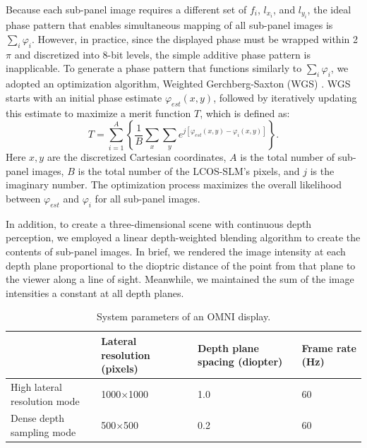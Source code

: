 \documentclass[9pt,twocolumn,twoside]{osajnl}
\begin{document}
Because each sub-panel image requires a different set of $f_i$, $l_{x_i}$, and $l_{y_i}$, the ideal phase pattern that enables simultaneous mapping of all sub-panel images is $\sum_{i}\varphi_{i}$. However, in practice, since the displayed phase must be wrapped within 2$\pi$ and discretized into 8-bit levels, the simple additive phase pattern is inapplicable. To generate a phase pattern that functions similarly to $\sum_{i}\varphi_{i}$, we adopted an optimization algorithm, Weighted Gerchberg-Saxton (WGS) \cite{di2007computer,bianchi2010real}. WGS starts with an initial phase estimate $\varphi_{est}(x,y)$, followed by iteratively updating this estimate to maximize a merit function $T$, which is defined as:
\begin{equation}
T=\sum_{i=1}^{A}\left\{\frac{1}{B}\sum_{x}\sum_{y}e^{j\left[\varphi _{est}(x,y)-\varphi _{i}(x,y)\right]}\right\}.
\label{eq:2}
\end{equation}
Here $x, y$ are the discretized Cartesian coordinates, $A$ is the total number of sub-panel images, $B$ is the total number of the LCOS-SLM’s pixels, and $j$ is the imaginary number. The optimization process maximizes the overall likelihood between $\varphi _{est}$ and $\varphi _{i}$ for all sub-panel images.\par
In addition, to create a three-dimensional scene with continuous depth perception, we employed a linear depth-weighted blending algorithm \cite{ravikumar2011creating} to create the contents of sub-panel images. In brief, we rendered the image intensity at each depth plane proportional to the dioptric distance of the point from that plane to the viewer along a line of sight. Meanwhile, we maintained the sum of the image intensities a constant at all depth planes.\par
\begin{table}[htbp]
	\centering
	\caption{System parameters of an OMNI display.}
	\label{table:2}
	\begin{tabular}{p{2.5cm}p{1.5cm}p{2cm}p{1cm}}
		\hline
		&Lateral resolution (pixels)&Depth plane spacing (diopter)&Frame rate (Hz)\\
		\hline
		High lateral resolution mode&1000$\times$1000&1.0&60\\
		Dense depth sampling mode&500$\times$500&0.2&60\\
		\hline
	\end{tabular}
\end{table}
\end{document}
